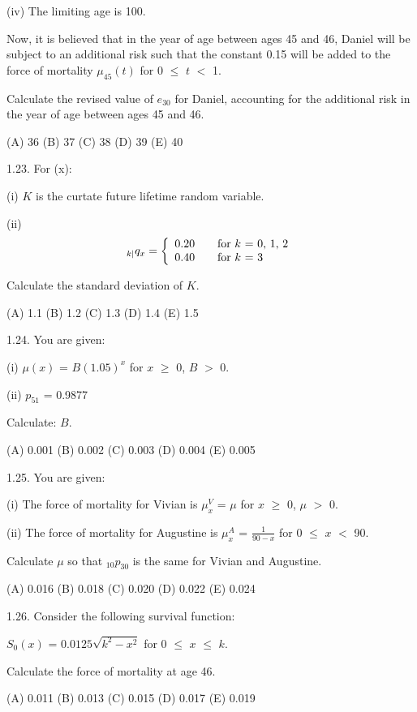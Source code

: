 \documentclass[]{book}
\begin{document}
(iv) The limiting age is 100.

Now, it is believed that in the year of age between ages 45 and 46,
Daniel will be subject to an additional risk such that the constant 0.15
will be added to the force of mortality \(\mu_{45}(t)\) for 0 \(\le\)
\(t\) \(<\) 1.

Calculate the revised value of \(e_{30}\) for Daniel, accounting for the
additional risk in the year of age between ages 45 and 46.

(A) 36 (B) 37 (C) 38 (D) 39 (E) 40

1.23. For (x):

(i) \(K\) is the curtate future lifetime random variable.

(ii) \[{}_{k|}q_{x} = \left\{
  \begin{array}{l l}
    0.20       & \quad \text{for $k$ = 0, 1, 2}\\
    0.40       & \quad \text{for $k$ = 3 }\\
  \end{array} \right.\]

Calculate the standard deviation of \(K\).

(A) 1.1 (B) 1.2 (C) 1.3 (D) 1.4 (E) 1.5

1.24. You are given:

(i) \(\mu(x)\) = \(B\)\((1.05)^{x}\) for \(x\) \(\ge\) 0, \(B\) \(>\) 0.

(ii) \(p_{51}\) = 0.9877

Calculate: \(B\).

(A) 0.001 (B) 0.002 (C) 0.003 (D) 0.004 (E) 0.005

1.25. You are given:

(i) The force of mortality for Vivian is \(\mu^{V}_x\) = \(\mu\) for
\(x\) \(\ge\) 0, \(\mu\) \(>\) 0.

(ii) The force of mortality for Augustine is \(\mu^{A}_x\) =
\(\frac{1}{90 - x}\) for 0 \(\le\) \(x\) \(<\) 90.

Calculate \(\mu\) so that \({}_{10}p_{30}\) is the same for Vivian and
Augustine.

(A) 0.016 (B) 0.018 (C) 0.020 (D) 0.022 (E) 0.024

1.26. Consider the following survival function:

\(S_0(x)\) = \(0.0125\sqrt{k^2 - x^2}\) for 0 \(\le\) \(x\) \(\le\)
\(k\).

Calculate the force of mortality at age 46.

(A) 0.011 (B) 0.013 (C) 0.015 (D) 0.017 (E) 0.019
\end{document}

